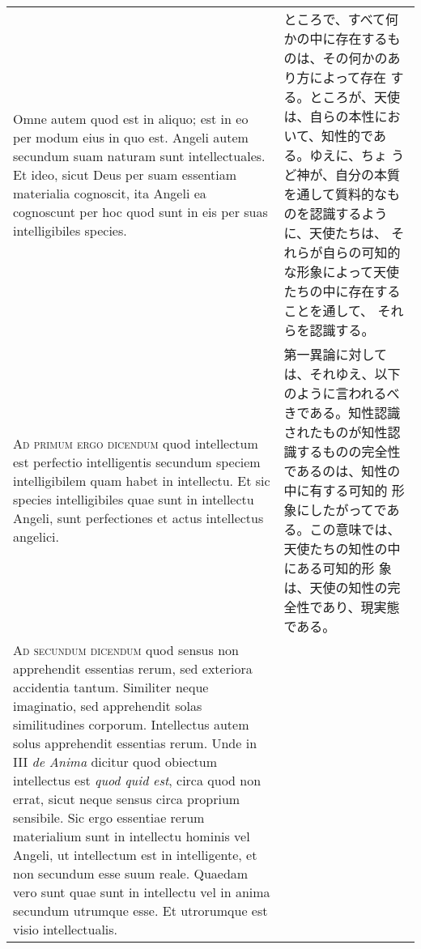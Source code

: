 \documentclass[10pt]{jsarticle} %
\begin{document}
\begin{longtable}{p{21em}p{21em}}
\\


Omne autem quod est in aliquo; est in eo per modum eius in quo
est. Angeli autem secundum suam naturam sunt intellectuales. Et ideo,
sicut Deus per suam essentiam materialia cognoscit, ita Angeli ea
cognoscunt per hoc quod sunt in eis per suas intelligibiles species.



&

ところで、すべて何かの中に存在するものは、その何かのあり方によって存在
する。ところが、天使は、自らの本性において、知性的である。ゆえに、ちょ
うど神が、自分の本質を通して質料的なものを認識するように、天使たちは、
それらが自らの可知的な形象によって天使たちの中に存在することを通して、
それらを認識する。


\\

{\scshape Ad primum ergo dicendum} quod intellectum est perfectio
intelligentis secundum speciem intelligibilem quam habet in
intellectu. Et sic species intelligibiles quae sunt in intellectu
Angeli, sunt perfectiones et actus intellectus angelici.


&

第一異論に対しては、それゆえ、以下のように言われるべきである。知性認識
されたものが知性認識するものの完全性であるのは、知性の中に有する可知的
形象にしたがってである。この意味では、天使たちの知性の中にある可知的形
象は、天使の知性の完全性であり、現実態である。


\\


{\scshape Ad secundum dicendum} quod sensus non apprehendit essentias
rerum, sed exteriora accidentia tantum. Similiter neque imaginatio,
sed apprehendit solas similitudines corporum. Intellectus autem solus
apprehendit essentias rerum. Unde in III {\itshape de Anima} dicitur
quod obiectum intellectus est {\itshape quod quid est}, circa quod non
errat, sicut neque sensus circa proprium sensibile. Sic ergo essentiae
rerum materialium sunt in intellectu hominis vel Angeli, ut
intellectum est in intelligente, et non secundum esse suum
reale. Quaedam vero sunt quae sunt in intellectu vel in anima secundum
utrumque esse. Et utrorumque est visio intellectualis.


&


\end{longtable}
\end{document}
